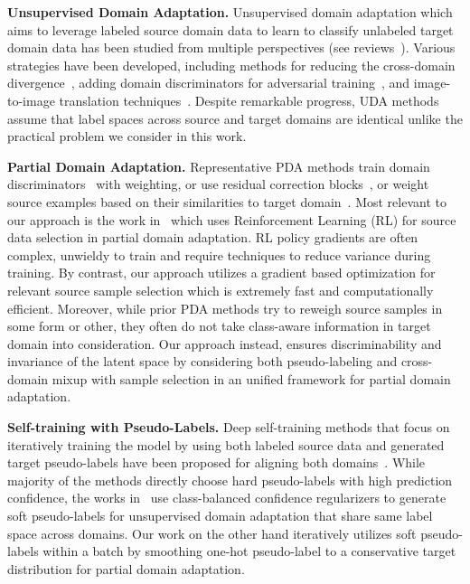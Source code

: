 \documentclass[10pt,twocolumn,letterpaper]{article}
\begin{document}
\noindent\textbf{Unsupervised Domain Adaptation.} Unsupervised domain adaptation which aims to leverage labeled source domain data to learn to classify unlabeled target domain data has been studied from multiple perspectives (see reviews~\cite{csurka2017domain, wang2018deep}). Various strategies have been developed, including methods for reducing the cross-domain divergence~\cite{gretton2012kernel, long2015learning, shen2017wasserstein, sun2016deep}, adding domain discriminators for adversarial training~\cite{chen2019joint, ganin2015unsupervised, ganin2016domain, long2015learning, long2018conditional, long2016unsupervised, pei2018multi, tzeng2017adversarial}, and image-to-image translation techniques~\cite{hoffman2018cycada,hu2018duplex,murez2018image}. Despite remarkable progress, UDA methods assume that label spaces across source and target domains are identical unlike the practical problem we consider in this work. 

\vspace{1mm}
\noindent\textbf{Partial Domain Adaptation.} 
Representative PDA methods train domain discriminators~\cite{cao2018partialsan, cao2018partialpada, zhang2018importance} with weighting, or use residual correction blocks~\cite{li2020deep}, or weight source examples based on their similarities to target domain~\cite{cao2019learning}. Most relevant to our approach is the work in~\cite{chen2019domain, chen2020selective} which uses Reinforcement Learning (RL) for source data selection in partial domain adaptation. RL policy gradients are
often complex, unwieldy to train and require techniques to reduce variance during training.
By contrast, our approach utilizes a gradient based optimization for relevant source sample selection which is extremely fast and computationally efficient.  
Moreover, while prior PDA methods try to reweigh source samples in some form or other, they often do not take class-aware information in target domain into consideration. Our approach instead, ensures discriminability and invariance of the latent space by considering both pseudo-labeling and cross-domain mixup with sample selection in an unified framework for partial domain adaptation.

\vspace{1mm}
\noindent\textbf{Self-training with Pseudo-Labels.} Deep self-training methods that focus on iteratively training the model by using both labeled source data and generated target pseudo-labels have been proposed for aligning both domains~\cite{inoue2018cross, mei2020instance, saito2017asymmetric, zhang2020label}. While majority of the methods directly choose hard pseudo-labels with high prediction confidence, the works in~\cite{zou2019confidence,zou2018unsupervised} use class-balanced confidence regularizers to generate soft pseudo-labels for unsupervised domain adaptation that share same label space across domains. Our work on the other hand iteratively utilizes soft pseudo-labels within a batch by smoothing one-hot pseudo-label to a conservative target distribution for partial domain adaptation.
\end{document}
